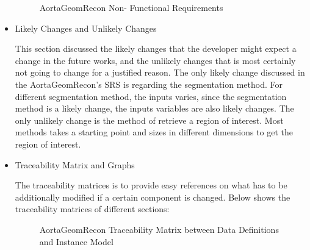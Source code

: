 \begin{itemize}
\begin{figure}[H]
    \centering
    \caption[AortaGeomRecon Non- Functional Requirements]{AortaGeomRecon Non- Functional Requirements}
    \label{fig_agr_nfr}
\end{figure}

\item Likely Changes and Unlikely Changes

This section discussed the likely changes that the developer might expect a change in the future works, and the unlikely changes that is most certainly not going to change for a justified reason. The only likely change discussed in the AortaGeomRecon's SRS is regarding the segmentation method. For different segmentation method, the inputs varies, since the segmentation method is a likely change, the inputs variables are also likely changes. The only unlikely change is the method of retrieve a region of interest. Most methods takes a starting point and sizes in different dimensions to get the region of interest.

\item Traceability Matrix and Graphs

The traceability matrices is to provide easy references on what has to be additionally modified if a certain component is changed. Below shows the traceability matrices of different sections:
\begin{figure}[H]
    \centering
    \caption[AortaGeomRecon Traceability Matrix between Data Definitions and Instance Model]{AortaGeomRecon Traceability Matrix between Data Definitions and Instance Model}
    \label{fig_agr_tm_dd_im}
\end{figure}


\end{itemize}

